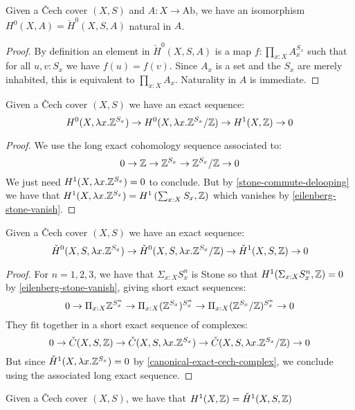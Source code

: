 \begin{lemma}\label{cech-eilenberg-0-agree}
Given a \v{C}ech cover $(X,S)$ and $A:X\to\mathrm{Ab}$, we have an isomorphism $H^0(X,A) = \check{H}^0(X,S,A)$ natural in $A$.
\end{lemma}

\begin{proof}
By definition an element in $\check{H}^0(X,S,A)$ is a map $f:\prod_{x:X}A_x^{S_x}$
such that for all $u,v:S_x$ we have $f(u)=f(v)$. Since $A_x$ is a set and the $S_x$ are merely inhabited, this is equivalent to $\prod_{x:X}A_x$. Naturality in $A$ is immediate.
\end{proof}

\begin{lemma}\label{eilenberg-exact}
Given a \v{C}ech cover $(X,S)$ we have an exact sequence:
\[H^0(X,\lambda x.\mathbb{Z}^{S_x}) \to H^0(X,\lambda x.\mathbb{Z}^{S_x}/\mathbb{Z}) \to H^1(X,\mathbb{Z})\to 0\]
\end{lemma}

\begin{proof}
We use the long exact cohomology sequence associated to:
\[0 \to \mathbb{Z} \to \mathbb{Z}^{S_x} \to \mathbb{Z}^{S_x}/\mathbb{Z}\to 0\]
We just need $H^1(X,\lambda x.\mathbb{Z}^{S_x}) = 0$ to conclude. But by \cref{stone-commute-delooping} we have that $H^1(X,\lambda x.\mathbb{Z}^{S_x}) = H^1\left(\sum_{x:X}S_x,\mathbb{Z}\right)$ which vanishes by \cref{eilenberg-stone-vanish}.
\end{proof}

\begin{lemma}\label{cech-exact}
Given a \v{C}ech cover $(X,S)$ we have an exact sequence:
\[\check{H}^0(X,S,\lambda x.\mathbb{Z}^{S_x}) \to \check{H}^0(X,S,\lambda x.\mathbb{Z}^{S_x}/\mathbb{Z}) \to \check{H}^1(X,S,\mathbb{Z})\to 0\]
\end{lemma}

\begin{proof}
For $n=1,2,3$, we have that $\Sigma_{x:X}S_x^n$ is Stone so that  $H^1(\Sigma_{x:X}S_x^n, \mathbb{Z}) = 0$ by \cref{eilenberg-stone-vanish}, giving short exact sequences:
\[0\to \Pi_{x:X}\mathbb{Z}^{S_x^n} \to \Pi_{x:X}(\mathbb{Z}^{S_x})^{S_x^n}\to \Pi_{x:X}(\mathbb{Z}^{S_x}/\mathbb{Z})^{S_x^n}\to 0\]
They fit together in a short exact sequence of complexes:
\[0 \to \check{C}(X,S,\mathbb{Z}) \to \check{C}(X,S,\lambda x.\mathbb{Z}^{S_x}) \to \check{C}(X,S,\lambda x.\mathbb{Z}^{S_x}/\mathbb{Z})\to 0\]
But since $\check{H}^1(X,\lambda x.\mathbb{Z}^{S_x}) = 0$ by \cref{canonical-exact-cech-complex}, we conclude using the associated long exact sequence.
\end{proof}

\begin{theorem}\label{cech-eilenberg-1-agree}
Given a \v{C}ech cover $(X,S)$, we have that $H^1(X,\mathbb{Z}) = \check{H}^1(X,S,\mathbb{Z})$
\end{theorem}

